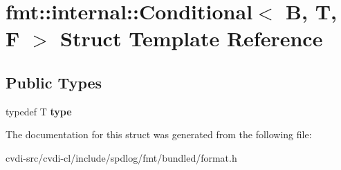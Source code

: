 \hypertarget{structfmt_1_1internal_1_1Conditional}{}\section{fmt\+:\+:internal\+:\+:Conditional$<$ B, T, F $>$ Struct Template Reference}
\label{structfmt_1_1internal_1_1Conditional}
\subsection*{Public Types}
\begin{DoxyCompactItemize}
\item 
typedef T {\bfseries type}\hypertarget{structfmt_1_1internal_1_1Conditional_a2670cd09823078e9ac3d59e8ad5e9e5e}{}\label{structfmt_1_1internal_1_1Conditional_a2670cd09823078e9ac3d59e8ad5e9e5e}

\end{DoxyCompactItemize}


The documentation for this struct was generated from the following file\+:\begin{DoxyCompactItemize}
\item 
cvdi-\/src/cvdi-\/cl/include/spdlog/fmt/bundled/format.\+h\end{DoxyCompactItemize}

